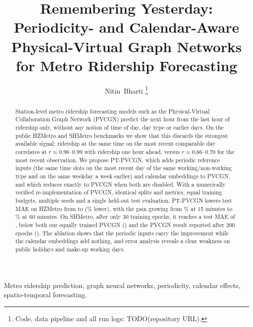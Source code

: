 \documentclass[journal]{IEEEtran}
\begin{document}
\title{Remembering Yesterday: Periodicity- and Calendar-Aware Physical-Virtual Graph Networks for Metro Ridership Forecasting}

\author{Nitin~Bharti%
\thanks{Code, data pipeline and all run logs: TODO(repository URL).}}

\maketitle

\begin{abstract}
Station-level metro ridership forecasting models such as the Physical-Virtual Collaboration Graph Network (PVCGN) predict the next hour from the last hour of ridership only, without any notion of time of day, day type or earlier days. On the public HZMetro and SHMetro benchmarks we show that this discards the strongest available signal: ridership at the same time on the most recent comparable day correlates at $r\approx0.96$--$0.99$ with ridership one hour ahead, versus $r\approx0.66$--$0.70$ for the most recent observation. We propose PT-PVCGN, which adds periodic reference inputs (the same time slots on the most recent day of the same working/non-working type and on the same weekday a week earlier) and calendar embeddings to PVCGN, and which reduces exactly to PVCGN when both are disabled. With a numerically verified re-implementation of PVCGN, identical splits and metrics, equal training budgets, multiple seeds and a single held-out test evaluation, PT-PVCGN lowers test MAE on HZMetro from \hzPV{} to \hzPT{} (\hzGain\% lower), with the gain growing from \hzGainFifteen\% at 15 minutes to \hzGainSixty\% at 60 minutes. On SHMetro, after only 30 training epochs, it reaches a test MAE of \shPT{}, below both our equally trained PVCGN (\shPV{}) and the PVCGN result reported after 200 epochs (\shPVpaper). The ablation shows that the periodic inputs carry the improvement while the calendar embeddings add nothing, and error analysis reveals a clear weakness on public holidays and make-up working days.
\end{abstract}

\begin{IEEEkeywords}
Metro ridership prediction, graph neural networks, periodicity, calendar effects, spatio-temporal forecasting.
\end{IEEEkeywords}
\end{document}
